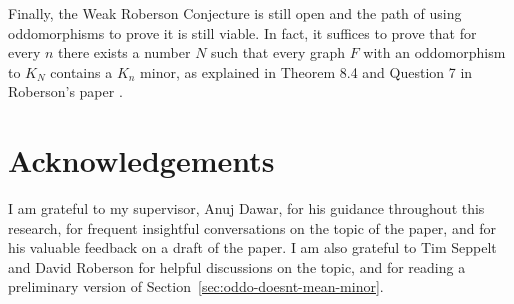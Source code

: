 \documentclass[11pt]{article}
\begin{document}
\par 
Finally, the Weak Roberson Conjecture is still open and the path of using oddomorphisms to prove it is still viable. 
In fact, it suffices to prove that for every $n$ there exists a number $N$ such that every graph $F$ with an oddomorphism to $K_N$ contains a $K_n$ minor, as explained in Theorem 8.4 and Question 7 in Roberson's paper \cite{roberson2022oddomorphisms}.

\section{Acknowledgements}
I am grateful to my supervisor, Anuj Dawar, for his guidance throughout this research, for frequent insightful conversations on the topic of the paper, and for his valuable feedback on a draft of the paper.
I am also grateful to Tim Seppelt and David Roberson for helpful discussions on the topic, and for reading a preliminary version of Section~\ref{sec:oddo-doesnt-mean-minor}.




\end{document}
